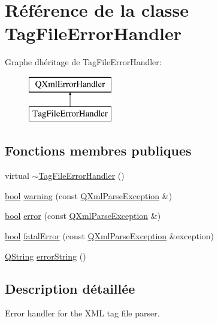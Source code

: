 \hypertarget{class_tag_file_error_handler}{}\section{Référence de la classe Tag\+File\+Error\+Handler}
\label{class_tag_file_error_handler}
Graphe d\textquotesingle{}héritage de Tag\+File\+Error\+Handler\+:\begin{figure}[H]
\begin{center}
\leavevmode
\includegraphics[height=2.000000cm]{class_tag_file_error_handler}
\end{center}
\end{figure}
\subsection*{Fonctions membres publiques}
\begin{DoxyCompactItemize}
\item 
virtual \hyperlink{class_tag_file_error_handler_a243caa42863d8458e8d291e8c1bc24cf}{$\sim$\+Tag\+File\+Error\+Handler} ()
\item 
\hyperlink{qglobal_8h_a1062901a7428fdd9c7f180f5e01ea056}{bool} \hyperlink{class_tag_file_error_handler_a5512c9023933b9a9a457f75f7654412a}{warning} (const \hyperlink{class_q_xml_parse_exception}{Q\+Xml\+Parse\+Exception} \&)
\item 
\hyperlink{qglobal_8h_a1062901a7428fdd9c7f180f5e01ea056}{bool} \hyperlink{class_tag_file_error_handler_ad72696a123207844853784754f3b9a4a}{error} (const \hyperlink{class_q_xml_parse_exception}{Q\+Xml\+Parse\+Exception} \&)
\item 
\hyperlink{qglobal_8h_a1062901a7428fdd9c7f180f5e01ea056}{bool} \hyperlink{class_tag_file_error_handler_a7562a9fb258c3d4005ea4a3327623e60}{fatal\+Error} (const \hyperlink{class_q_xml_parse_exception}{Q\+Xml\+Parse\+Exception} \&exception)
\item 
\hyperlink{class_q_string}{Q\+String} \hyperlink{class_tag_file_error_handler_a699ed3bca495674a04d051a6a7a0b96d}{error\+String} ()
\end{DoxyCompactItemize}


\subsection{Description détaillée}
Error handler for the X\+M\+L tag file parser.

